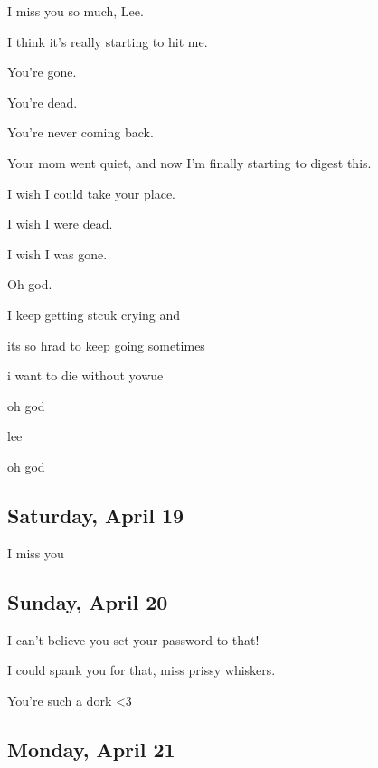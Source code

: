 { I miss you so much, Lee.

 I think it's really starting to hit me.

 You're gone.

 You're dead.

 You're never coming back.

 Your mom went quiet, and now I'm finally starting to digest this.

 I wish I could take your place.

 I wish I were dead.

 I wish I was gone.

 Oh god.

 I keep getting stcuk crying and

 its so hrad to keep going sometimes

 i want to die without yowue

 oh god

 lee

 oh god

\newpage

\subsection*{Saturday, April 19}\label{saturday-april-19}

 I miss you

\newpage

\subsection*{Sunday, April 20}\label{sunday-april-20}

 I can't believe you set your password to that!

 I could spank you for that, miss prissy whiskers.

 You're such a dork \textless{}3

\newpage

\subsection*{Monday, April 21}\label{monday-april-21}

}
